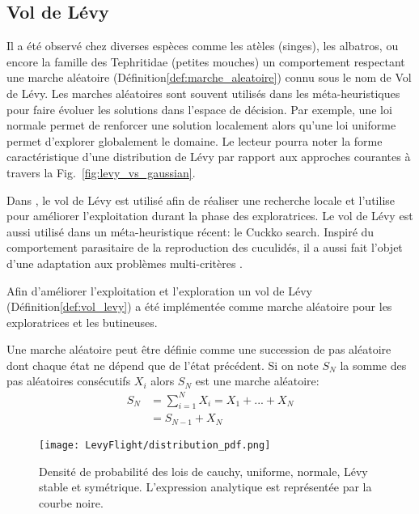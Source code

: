 \subsection{Vol de Lévy} %
\label{sub:vol_de_levy}
Il a été observé chez diverses espèces comme les atèles (singes), les albatros, ou encore la famille des
Tephritidae (petites mouches) un comportement respectant une marche aléatoire (Définition\ref{def:marche_aleatoire}) connu
sous le nom de Vol de Lévy.
Les marches aléatoires sont souvent utilisés dans les méta-heuristiques pour faire
évoluer les solutions dans l’espace de décision. Par exemple, une loi normale permet
de renforcer une solution localement alors qu’une loi uniforme permet d’explorer
globalement le domaine. Le lecteur pourra noter la forme caractéristique d’une distribution
de Lévy par rapport aux approches courantes à travers la Fig.~\ref{fig:levy_vs_gaussian}.

Dans \cite{Sharma2012213}, le vol de Lévy est utilisé afin de réaliser une recherche locale
et \cite{Hakli2013254} l’utilise pour améliorer l’exploitation durant la phase des exploratrices.
Le vol de Lévy est aussi utilisé dans un méta-heuristique récent: le Cuckko search.
Inspiré du comportement parasitaire de la reproduction des cuculidés, il a aussi fait l’objet
d’une adaptation aux problèmes multi-critères \parencite{Yang20131616}.

Afin d’améliorer l’exploitation et l’exploration un vol de Lévy (Définition\ref{def:vol_levy})
a été implémentée comme marche aléatoire pour les exploratrices et les butineuses.

\begin{Def}\label{def:marche_aleatoire}
Une marche aléatoire \parencite{Yang201445} peut être définie comme une succession de pas
aléatoire dont chaque état ne dépend que de l’état précédent. Si on note $S_{N}$
la somme des pas aléatoires consécutifs $X_{i}$ alors $S_{N}$ est une marche aléatoire:
\begin{equation}\label{eq:marche_aleatoire}
    \begin{split}
        S_{N} &= \sum_{i=1}^{N} X_{i} = X_{1} + ... + X_{N}\\
              &= S_{N-1} + X_{N}
    \end{split}
\end{equation}
\end{Def}

\begin{figure}
    \begin{center}
        \texttt{[image: LevyFlight/distribution\_pdf.png]}
    \end{center}
    \caption{Densité de probabilité des lois de cauchy, uniforme, normale, Lévy stable et symétrique.
             L’expression analytique est représentée par la courbe noire.
             \label{fig:distribution_pdf}}
\end{figure}

